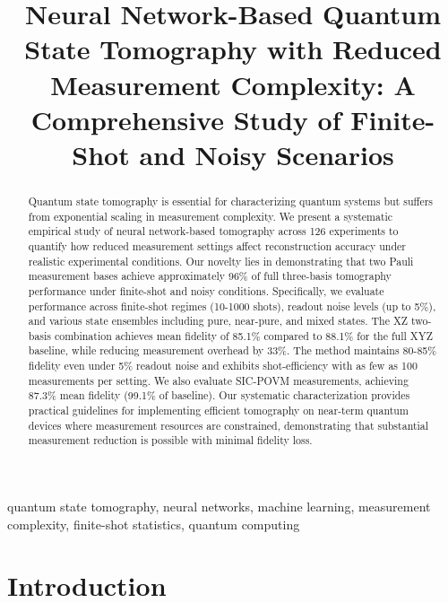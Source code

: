 \documentclass[conference]{IEEEtran}
\begin{document}
\title{Neural Network-Based Quantum State Tomography with Reduced Measurement Complexity: A Comprehensive Study of Finite-Shot and Noisy Scenarios}

\author{
}

\maketitle

\begin{abstract}
Quantum state tomography is essential for characterizing quantum systems but suffers from exponential scaling in measurement complexity. We present a systematic empirical study of neural network-based tomography across 126 experiments to quantify how reduced measurement settings affect reconstruction accuracy under realistic experimental conditions. Our novelty lies in demonstrating that two Pauli measurement bases achieve approximately 96\% of full three-basis tomography performance under finite-shot and noisy conditions. Specifically, we evaluate performance across finite-shot regimes (10-1000 shots), readout noise levels (up to 5\%), and various state ensembles including pure, near-pure, and mixed states. The XZ two-basis combination achieves mean fidelity of 85.1\% compared to 88.1\% for the full XYZ baseline, while reducing measurement overhead by 33\%. The method maintains 80-85\% fidelity even under 5\% readout noise and exhibits shot-efficiency with as few as 100 measurements per setting. We also evaluate SIC-POVM measurements, achieving 87.3\% mean fidelity (99.1\% of baseline). Our systematic characterization provides practical guidelines for implementing efficient tomography on near-term quantum devices where measurement resources are constrained, demonstrating that substantial measurement reduction is possible with minimal fidelity loss.
\end{abstract}

\begin{IEEEkeywords}
quantum state tomography, neural networks, machine learning, measurement complexity, finite-shot statistics, quantum computing
\end{IEEEkeywords}

\section{Introduction}
\end{document}
